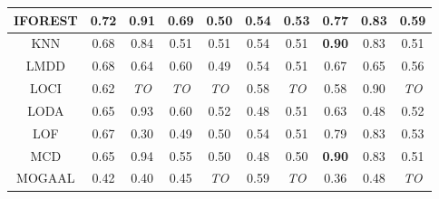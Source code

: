 \begin{table*}[!t]
\begin{tabular}{|c|c|c|c|c|c|c|c|c|c|}
\hline
                IFOREST &                         0.72 &                      0.91 &                     0.69 &                    0.50 &                    0.54 &                   0.53 &                         0.77 &                     0.83 &                          0.59 \\
\hline
                        KNN &                         0.68 &                      0.84 &                     0.51 &                    0.51 &                    0.54 &                   0.51 &                \textbf{0.90} &                     0.83 &                          0.51 \\
\hline
                        LMDD &                         0.68 &                      0.64 &                     0.60 &                    0.49 &                    0.54 &                   0.51 &                         0.67 &                     0.65 &                          0.56 \\
\hline
                        LOCI &                         0.62 &               \textit{TO} &              \textit{TO} &             \textit{TO} &                    0.58 &            \textit{TO} &                         0.58 &                     0.90 &                   \textit{TO} \\
\hline
                        LODA &                         0.65 &                      0.93 &                     0.60 &                    0.52 &                    0.48 &                   0.51 &                         0.63 &                     0.48 &                          0.52 \\
\hline
                        LOF &                         0.67 &                      0.30 &                     0.49 &                    0.50 &                    0.54 &                   0.51 &                         0.79 &                     0.83 &                          0.53 \\
\hline
                        MCD &                         0.65 &                      0.94 &                     0.55 &                    0.50 &                    0.48 &                   0.50 &                \textbf{0.90} &                     0.83 &                          0.51 \\
\hline
                        MOGAAL &                         0.42 &                      0.40 &                     0.45 &             \textit{TO} &                    0.59 &            \textit{TO} &                         0.36 &                     0.48 &                   \textit{TO} \\

\end{tabular}
\end{table*}
